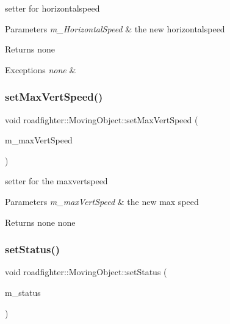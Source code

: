 setter for horizontalspeed 
\begin{DoxyParams}{Parameters}
{\em m\+\_\+\+Horizontal\+Speed} & the new horizontalspeed \\
\hline
\end{DoxyParams}
\begin{DoxyReturn}{Returns}
none 
\end{DoxyReturn}

\begin{DoxyExceptions}{Exceptions}
{\em none} & \\
\hline
\end{DoxyExceptions}
\mbox{\label{classroadfighter_1_1MovingObject_a193dbc310915e3f81071170b3250516e}} 
\subsubsection{\texorpdfstring{set\+Max\+Vert\+Speed()}{setMaxVertSpeed()}}
{\footnotesize\ttfamily void roadfighter\+::\+Moving\+Object\+::set\+Max\+Vert\+Speed (\begin{DoxyParamCaption}\item[{double}]{m\+\_\+max\+Vert\+Speed }\end{DoxyParamCaption})}

setter for the maxvertspeed 
\begin{DoxyParams}{Parameters}
{\em m\+\_\+max\+Vert\+Speed} & the new max speed \\
\hline
\end{DoxyParams}
\begin{DoxyReturn}{Returns}
none  none 
\end{DoxyReturn}
\mbox{\label{classroadfighter_1_1MovingObject_ab1f380b45e20697c45b6ed7b466ca0e9}} 
\subsubsection{\texorpdfstring{set\+Status()}{setStatus()}}
{\footnotesize\ttfamily void roadfighter\+::\+Moving\+Object\+::set\+Status (\begin{DoxyParamCaption}\item[{E\+Status}]{m\+\_\+status }\end{DoxyParamCaption})}

